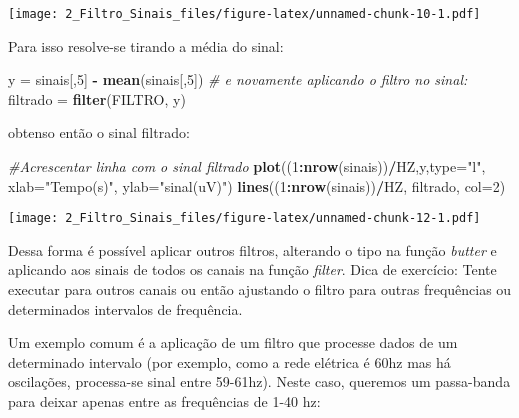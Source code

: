 \documentclass[]{article}
\newenvironment{Shaded}{\begin{snugshade}}{\end{snugshade}}
\newcommand{\KeywordTok}[1]{\textcolor[rgb]{0.13,0.29,0.53}{\textbf{#1}}}
\newcommand{\DataTypeTok}[1]{\textcolor[rgb]{0.13,0.29,0.53}{#1}}
\newcommand{\DecValTok}[1]{\textcolor[rgb]{0.00,0.00,0.81}{#1}}
\newcommand{\StringTok}[1]{\textcolor[rgb]{0.31,0.60,0.02}{#1}}
\newcommand{\CommentTok}[1]{\textcolor[rgb]{0.56,0.35,0.01}{\textit{#1}}}
\newcommand{\OperatorTok}[1]{\textcolor[rgb]{0.81,0.36,0.00}{\textbf{#1}}}
\newcommand{\NormalTok}[1]{#1}
\begin{document}
\texttt{[image: 2\_Filtro\_Sinais\_files/figure-latex/unnamed-chunk-10-1.pdf]}

Para isso resolve-se tirando a média do sinal:

\begin{Shaded}
\begin{Highlighting}[]
\NormalTok{y =}\StringTok{ }\NormalTok{sinais[,}\DecValTok{5}\NormalTok{] }\OperatorTok{-}\StringTok{ }\KeywordTok{mean}\NormalTok{(sinais[,}\DecValTok{5}\NormalTok{])}
\CommentTok{# e novamente aplicando o filtro no sinal:}
\NormalTok{filtrado =}\StringTok{ }\KeywordTok{filter}\NormalTok{(FILTRO, y)}
\end{Highlighting}
\end{Shaded}

obtenso então o sinal filtrado:

\begin{Shaded}
\begin{Highlighting}[]
\CommentTok{#Acrescentar linha com o sinal filtrado}
\KeywordTok{plot}\NormalTok{((}\DecValTok{1}\OperatorTok{:}\KeywordTok{nrow}\NormalTok{(sinais))}\OperatorTok{/}\NormalTok{HZ,y,}\DataTypeTok{type=}\StringTok{"l"}\NormalTok{,}
     \DataTypeTok{xlab=}\StringTok{"Tempo(s)"}\NormalTok{, }\DataTypeTok{ylab=}\StringTok{"sinal(uV)"}\NormalTok{)}
\KeywordTok{lines}\NormalTok{((}\DecValTok{1}\OperatorTok{:}\KeywordTok{nrow}\NormalTok{(sinais))}\OperatorTok{/}\NormalTok{HZ, filtrado, }\DataTypeTok{col=}\DecValTok{2}\NormalTok{)}
\end{Highlighting}
\end{Shaded}

\texttt{[image: 2\_Filtro\_Sinais\_files/figure-latex/unnamed-chunk-12-1.pdf]}

Dessa forma é possível aplicar outros filtros, alterando o tipo na
função \emph{butter} e aplicando aos sinais de todos os canais na função
\emph{filter}. Dica de exercício: Tente executar para outros canais ou
então ajustando o filtro para outras frequências ou determinados
intervalos de frequência.

Um exemplo comum é a aplicação de um filtro que processe dados de um
determinado intervalo (por exemplo, como a rede elétrica é 60hz mas há
oscilações, processa-se sinal entre 59-61hz). Neste caso, queremos um
passa-banda para deixar apenas entre as frequências de 1-40 hz:
\end{document}
